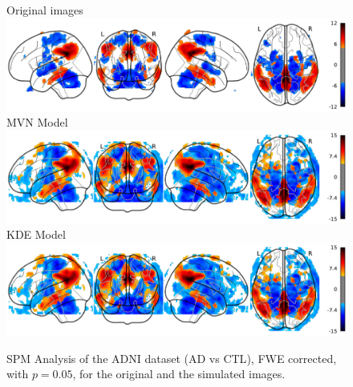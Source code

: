 \begin{figure}
	\centering
	Original \adnipet{} images\\
	\includegraphics[width=\linewidth]{Graphics/ch8/NORvsAD_Orig_glass}\\
	\ac{MVN} Model\\
	\includegraphics[width=\linewidth]{Graphics/ch8/NORvsAD_MVN_glass}\\
	\ac{KDE} Model\\
	\includegraphics[width=\linewidth]{Graphics/ch8/NORvsAD_KDE_glass}
	\caption[\acs{SPM} Analysis of the \acs{ADNI} dataset (\acs{AD} vs \acs{CTL}).]{\ac{SPM} Analysis of the \acs{ADNI} dataset (\ac{AD} vs \ac{CTL}), \ac{FWE} corrected, with $p=0.05$, for the original and the simulated images.}
	\label{fig:spmAD}
\end{figure}



